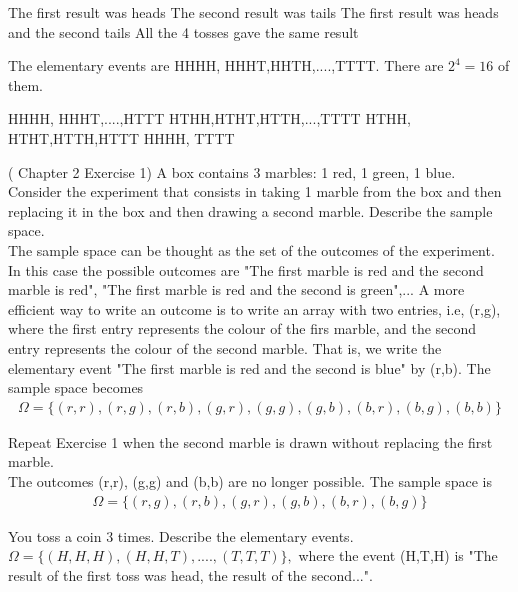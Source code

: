 \documentclass[12pt]{article}
\newcommand{\<}{{\langle \!\! \langle}}
\renewcommand{\>}{{\rangle \!\! \rangle}}
\newcommand{\bel}[2]{\begin{equation} \label{#1} \begin{split} #2
 					\end{split} \end{equation}}
\begin{document}
\begin{ExerciseList}
    
      \Question The first result was heads
      \Question The second result was tails
      \Question The first result was heads and the second tails 
      \Question All the 4 tosses gave the same result
    
	\Answer  The elementary events are HHHH, HHHT,HHTH,....,TTTT. There are $2^4=16$ of them.

	\Question HHHH, HHHT,....,HTTT 
	\Question HTHH,HTHT,HTTH,...,TTTT
	\Question HTHH, HTHT,HTTH,HTTT
	\Question  HHHH, TTTT

	\Exercise (\cite{Ross} Chapter 2 Exercise 1)
  A box contains 3 marbles: 1 red, 1 green, 1 blue. Consider the experiment that consists in taking 1 marble from the box and then replacing it in the box and then drawing a second marble. Describe the sample space.\\
 	
	\Answer The sample space can be thought as the set of the outcomes of the experiment. In this case the possible outcomes are "The first marble is red and the second marble is red", "The first marble is red and the second is green",... A more efficient way to write an outcome is to write an array with two entries, i.e, (r,g), where the first entry represents the colour of the firs marble, and the second entry represents the colour of the second marble. That is, we write the elementary event "The first marble is red and the second is blue" by (r,b). The sample space becomes 
  \bel{ex1}{\Omega=\{(r,r), (r,g),(r,b),(g,r), (g,g),(g,b),(b,r),(b,g),(b,b)\}}
 
 	\Exercise
 Repeat Exercise 1 when the second marble is drawn without replacing the first marble.\\
 	
	\Answer The outcomes (r,r), (g,g) and (b,b) are no longer possible. The sample space is 
 \bel{ex2}{\Omega=\{(r,g),(r,b),(g,r),(g,b),(b,r),(b,g)\}}
     
	\Exercise
You toss a coin 3 times. Describe the elementary events.\\
	
	\Answer $\Omega=\{(H,H,H), (H,H,T),....,(T,T,T)\},$ where the event (H,T,H) is "The result of the first toss was head, the result of the second...". 

\end{ExerciseList}

\end{document}
